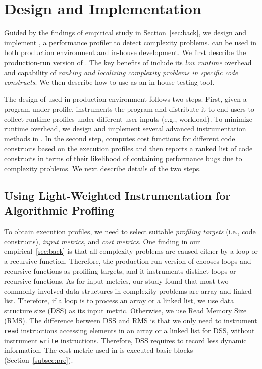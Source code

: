 \section{\Tool Design and Implementation}
\label{sec:online}


Guided by the findings of empirical study in Section~\ref{sec:back},
we design and implement \Tool, a performance 
profiler to detect complexity problems. \Tool
can be used in both production environment 
and in-house development. We first describe
the production-run version of \Tool. 
The key benefits of \Tool include its \emph{low runtime} overhead and  capability of \emph{ranking 
and localizing complexity problems in specific code constructs}. 
We then describe how to use \Tool as an in-house testing tool. 

The design of \Tool used in production environment 
follows two steps. First, given a program under profile,
\Tool instruments the program and
distribute it to end users to collect runtime profiles
under different user inputs (e.g., workload). 
To minimize runtime overhead, we design and implement
several advanced instrumentation methods in \Tool. 
In the second step, \Tool computes cost functions for
different code constructs based on the execution profiles
and then reports a ranked list of code constructs in
terms of their likelihood of containing performance bugs due to
complexity problems.  We next describe details of the two steps. 


\subsection{Using Light-Weighted Instrumentation 
for Algorithmic Profling}

To obtain execution profiles, we need to select suitable \emph{profiling targets} (i.e.,
code constructs), \emph{input metrics}, and \emph{cost metrics}. 
One finding in our empirical~\ref{sec:back} is that  all complexity problems are 
caused either by a loop or a recursive function. 
Therefore, the production-run version of \Tool chooses loops 
and recursive functions as profiling targets, 
and it instruments distinct loops or recursive functions. 
As for input metrics, our study found that  most two commonly involved 
data structures in complexity problems 
are array and linked list. Therefore, if a loop is to process an array 
or a linked list, we use data structure size (DSS) as its input metric. Otherwise, we use Read Memory Size (RMS). 
The difference between DSS and RMS is that 
we only need to instrument \texttt{read} instructions  accessing elements 
in an array or a linked list for DSS,  without instrument \texttt{write} instructions.
Therefore, DSS requires to record less dynamic information. 
The cost metric used in \Tool is executed basic blocks (Section~\ref{subsec:pre}).

